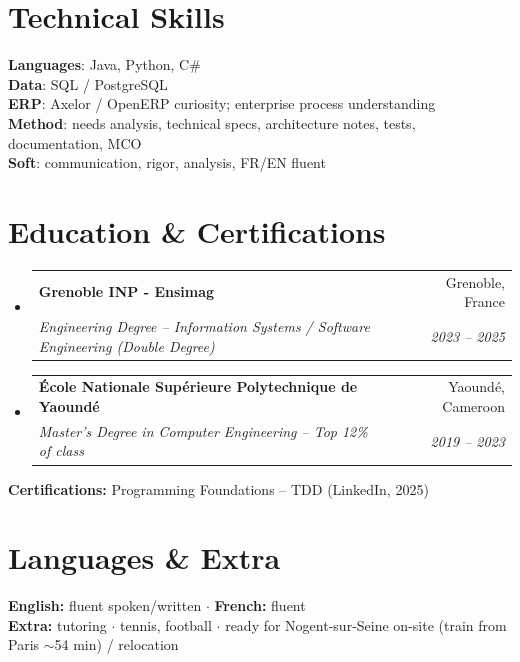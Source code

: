 \documentclass[letterpaper,10.5pt]{article}
\makeatletter
\newcommand{\resumeSubheading}[4]{\vspace{-1pt}\item\begin{tabular*}{0.97\textwidth}[t]{l@{\extracolsep{\fill}}r}\textbf{#1} & #2 \\\textit{\small#3} & \textit{\small #4} \\\end{tabular*}\vspace{-5pt}}
\newcommand{\resumeSubHeadingListStart}{\begin{itemize}[leftmargin=0.15in, label={}]}
\newcommand{\resumeSubHeadingListEnd}{\end{itemize}}
\makeatother
\begin{document}
\section{Technical Skills}
\begin{itemize}[leftmargin=0.15in, label={}]\small{\item{\textbf{Languages}: Java, Python, C\# \\ \textbf{Data}: SQL / PostgreSQL \\ \textbf{ERP}: Axelor / OpenERP curiosity; enterprise process understanding \\ \textbf{Method}: needs analysis, technical specs, architecture notes, tests, documentation, MCO \\ \textbf{Soft}: communication, rigor, analysis, FR/EN fluent}}\end{itemize}
\section{Education \& Certifications}
\resumeSubHeadingListStart
  \resumeSubheading{Grenoble INP - Ensimag}{Grenoble, France}{Engineering Degree -- Information Systems / Software Engineering (Double Degree)}{2023 -- 2025}
  \resumeSubheading{\'Ecole Nationale Sup\'erieure Polytechnique de Yaound\'e}{Yaound\'e, Cameroon}{Master's Degree in Computer Engineering -- Top 12\% of class}{2019 -- 2023}
\resumeSubHeadingListEnd
\small{\textbf{Certifications:} Programming Foundations -- TDD (LinkedIn, 2025)}
\section{Languages \& Extra}
\small{\textbf{English:} fluent spoken/written $\cdot$ \textbf{French:} fluent \\ \textbf{Extra:} tutoring $\cdot$ tennis, football $\cdot$ ready for Nogent-sur-Seine on-site (train from Paris $\sim$54 min) / relocation}
\end{document}
